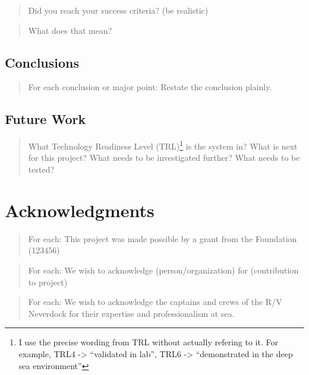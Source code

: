 \documentclass[
  10pt,
  draftcls,
  technote,
  letterpaper,
  oneside,
  onecolumn]{IEEEtran}
\begin{document}
\begin{quote}
Did you reach your success criteria? (be realistic)
\end{quote}

\begin{quote}
What does that mean?
\end{quote}

\hypertarget{conclusions}{%
\subsection{Conclusions}\label{conclusions}}

\begin{quote}
For each conclusion or major point: Restate the conclusion plainly.
\end{quote}

\hypertarget{future-work}{%
\subsection{Future Work}\label{future-work}}

\begin{quote}
What Technology Readiness Level (TRL)\footnote{I use the precise wording
  from TRL without actually refering to it. For example, TRL4
  -\textgreater{} ``validated in lab'', TRL6 -\textgreater{}
  ``demonstrated in the deep sea environment''} is the system in? What
is next for this project? What needs to be investigated further? What
needs to be tested?
\end{quote}

\hypertarget{acknowledgments}{%
\section{Acknowledgments}\label{acknowledgments}}

\begin{quote}
For each: This project was made possible by a grant from the Foundation
(123456)
\end{quote}

\begin{quote}
For each: We wish to acknowledge (person/organization) for (contribution
to project)
\end{quote}

\begin{quote}
For each: We wish to acknowledge the captains and crews of the R/V
Neverdock for their expertise and professionalism at sea.
\end{quote}
\end{document}
